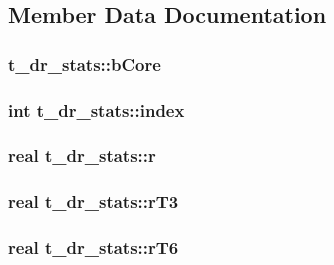 \subsection{\-Member \-Data \-Documentation}
\hypertarget{structt__dr__stats_a1dcf538aa2e7f5700cd36566d059269e}{
\subsubsection[{b\-Core}]{ {\bf t\-\_\-dr\-\_\-stats\-::b\-Core}}}\label{structt__dr__stats_a1dcf538aa2e7f5700cd36566d059269e}
\hypertarget{structt__dr__stats_a370117c47a10cc11a5052f59eb48f194}{
\subsubsection[{index}]{\setlength{\rightskip}{0pt plus 5cm}int {\bf t\-\_\-dr\-\_\-stats\-::index}}}\label{structt__dr__stats_a370117c47a10cc11a5052f59eb48f194}
\hypertarget{structt__dr__stats_ad5869b91deaa4a8b31812d015e2b0c22}{
\subsubsection[{r}]{\setlength{\rightskip}{0pt plus 5cm}real {\bf t\-\_\-dr\-\_\-stats\-::r}}}\label{structt__dr__stats_ad5869b91deaa4a8b31812d015e2b0c22}
\hypertarget{structt__dr__stats_af5020f0342249fcbde91b1f2e47e0f79}{
\subsubsection[{r\-T3}]{\setlength{\rightskip}{0pt plus 5cm}real {\bf t\-\_\-dr\-\_\-stats\-::r\-T3}}}\label{structt__dr__stats_af5020f0342249fcbde91b1f2e47e0f79}
\hypertarget{structt__dr__stats_a13849337a19a401384fad985e6278e6b}{
\subsubsection[{r\-T6}]{\setlength{\rightskip}{0pt plus 5cm}real {\bf t\-\_\-dr\-\_\-stats\-::r\-T6}}}\label{structt__dr__stats_a13849337a19a401384fad985e6278e6b}
